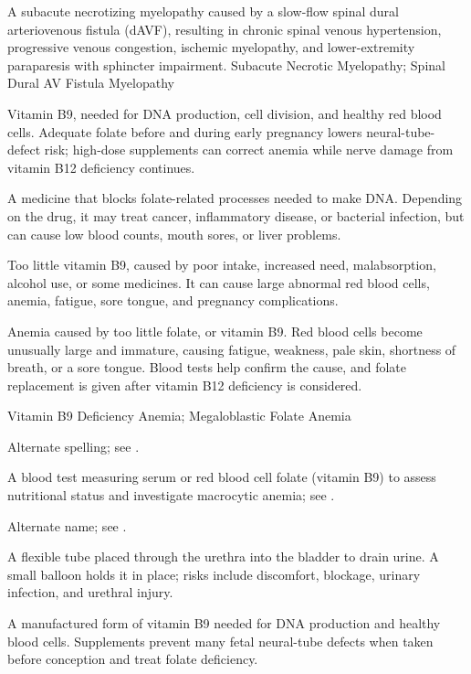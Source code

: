  A subacute necrotizing myelopathy caused by a slow-flow spinal dural arteriovenous fistula (dAVF), resulting in chronic spinal venous hypertension, progressive venous congestion, ischemic myelopathy, and lower-extremity paraparesis with sphincter impairment.
\synonyms
Subacute Necrotic Myelopathy; Spinal Dural AV Fistula Myelopathy

 Vitamin B9, needed for DNA production, cell division, and healthy red blood cells. Adequate folate before and during early pregnancy lowers neural-tube-defect risk; high-dose supplements can correct anemia while nerve damage from vitamin B12 deficiency continues.

 A medicine that blocks folate-related processes needed to make DNA. Depending on the drug, it may treat cancer, inflammatory disease, or bacterial infection, but can cause low blood counts, mouth sores, or liver problems.

 Too little vitamin B9, caused by poor intake, increased need, malabsorption, alcohol use, or some medicines. It can cause large abnormal red blood cells, anemia, fatigue, sore tongue, and pregnancy complications.

 Anemia caused by too little folate, or vitamin B9. Red blood cells become unusually large and immature, causing fatigue, weakness, pale skin, shortness of breath, or a sore tongue. Blood tests help confirm the cause, and folate replacement is given after vitamin B12 deficiency is considered.

\synonyms
Vitamin B9 Deficiency Anemia; Megaloblastic Folate Anemia

 Alternate spelling; see .

 A blood test measuring serum or red blood cell folate (vitamin B9) to assess nutritional status and investigate macrocytic anemia; see .

 Alternate name; see .

 A flexible tube placed through the urethra into the bladder to drain urine. A small balloon holds it in place; risks include discomfort, blockage, urinary infection, and urethral injury.

 A manufactured form of vitamin B9 needed for DNA production and healthy blood cells. Supplements prevent many fetal neural-tube defects when taken before conception and treat folate deficiency.

